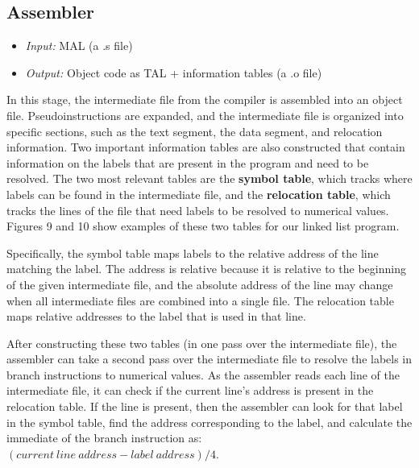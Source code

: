 \documentclass{article}
\begin{document}
\subsection{Assembler}
\begin{itemize}
\item \textit{Input:} MAL (a .s file)
\item \textit{Output:} Object code as TAL + information tables (a .o file)
\end{itemize}
In this stage, the intermediate file from the compiler is assembled into an object file. Pseudoinstructions are expanded, and the intermediate file is organized into specific sections, such as the text segment, the data segment, and relocation information. Two important information tables are also constructed that contain information on the labels that are present in the program and need to be resolved. The two most relevant tables are the \textbf{symbol table}, which tracks where labels can be found in the intermediate file, and the \textbf{relocation table}, which tracks the lines of the file that need labels to be resolved to numerical values. Figures 9 and 10 show examples of these two tables for our linked list program.

Specifically, the symbol table maps labels to the relative address of the line matching the label. The address is relative because it is relative to the beginning of the given intermediate file, and the absolute address of the line may change when all intermediate files are combined into a single file. The relocation table maps relative addresses to the label that is used in that line. 

After constructing these two tables (in one pass over the intermediate file), the assembler can take a second pass over the intermediate file to resolve the labels in branch instructions to numerical values. As the assembler reads each line of the intermediate file, it can check if the current line's address is present in the relocation table. If the line is present, then the assembler can look for that label in the symbol table, find the address corresponding to the label, and calculate the immediate of the branch instruction as: $(current \ line \ address - label \ address) / 4$.
\end{document}
